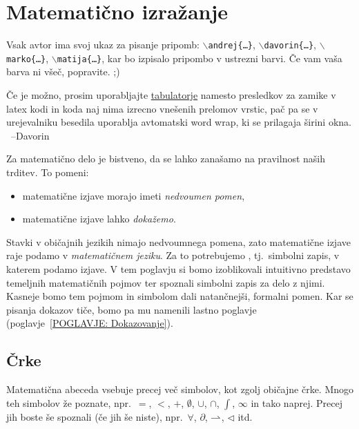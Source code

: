 \chapter{Matematično izražanje}\label{POGLAVJE: Matematično izražanje}


	\alert{Vsak avtor ima svoj ukaz za pisanje pripomb: \textcolor{andrejcolor}{\texttt{$\backslash$andrej\{\ldots\}}}, \textcolor{davorincolor}{\texttt{$\backslash$davorin\{\ldots\}}}, \textcolor{markocolor}{\texttt{$\backslash$marko\{\ldots\}}}, \textcolor{matijacolor}{\texttt{$\backslash$matija\{\ldots\}}}, kar bo izpisalo pripombo v ustrezni barvi. Če vam vaša barva ni všeč, popravite. ;)}
	
	
	\alert{Če je možno, prosim uporabljajte \uline{tabulatorje} namesto presledkov za zamike v latex kodi in koda naj nima izrecno vnešenih prelomov vrstic, pač pa se v urejevalniku besedila uporablja avtomatski word wrap, ki se prilagaja širini okna. \ --Davorin}
	
	Za matematično delo je bistveno, da se lahko zanašamo na pravilnost naših trditev. To pomeni:
	\begin{itemize}
		\item
			matematične izjave morajo imeti \emph{nedvoumen pomen},
		\item
			matematične izjave lahko \emph{dokažemo}.
	\end{itemize}
	
	Stavki v običajnih jezikih nimajo nedvoumnega pomena, zato matematične izjave raje podamo v \emph{matematičnem jeziku}. Za to potrebujemo , tj.~simbolni zapis, v katerem podamo izjave. V tem poglavju si bomo izoblikovali intuitivno predstavo temeljnih matematičnih pojmov ter spoznali simbolni zapis za delo z njimi. Kasneje bomo tem pojmom in simbolom dali natančnejši, formalni pomen. Kar se pisanja dokazov tiče, bomo pa mu namenili lastno poglavje (poglavje~\ref{POGLAVJE: Dokazovanje}).
	
	
	\section{Črke}
	
		Matematična abeceda vsebuje precej več simbolov, kot zgolj običajne črke. Mnogo teh simbolov že poznate, npr.~$=$, $<$, $+$, $\emptyset$, $\cup$, $\cap$, $\int$, $\infty$ in tako naprej. Precej jih boste še spoznali (če jih še niste), npr.~$\forall$, $\partial$, $\mathrel{\rightharpoonup}$, $\lhd$ itd.
		
